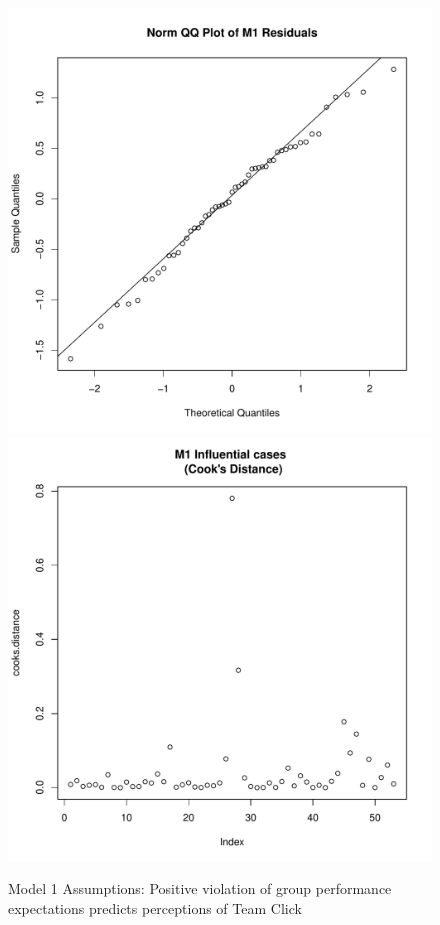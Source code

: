 \begin{figure}[htbp]
    \includegraphics[scale =.4]{images/TEM1QQNorm.pdf}
    \includegraphics[scale =.4]{images/TEM1CooksD.pdf}
    \caption{Model 1 Assumptions: Positive violation of group performance expectations predicts perceptions of Team Click}
    \label{fig:M1Assumptions}
\end{figure}

